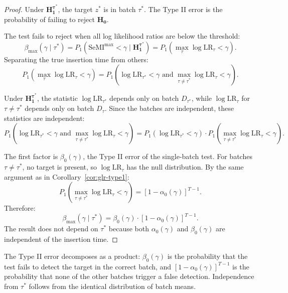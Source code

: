 \documentclass{article}
\theoremstyle{plain}
\theoremstyle{definition}
\theoremstyle{remark}
\newcommand{\SeMImax}{\mathrm{SeMI}^{\max}}
\begin{document}
\begin{proof}
    Under $\mathbf{H_1^{\tau^*}}$, the target $z^*$ is in batch $\tau^*$. The Type II error is the probability of failing to reject $\mathbf{H_0}$.

    The test fails to reject when all log likelihood ratios are below the threshold:
    \begin{equation*}
        \beta_{\max}(\gamma \mid \tau^*) = P_1(\SeMImax < \gamma \mid \mathbf{H_1^{\tau^*}}) = P_1\left(\max_{\tau} \log \mathrm{LR}_\tau < \gamma\right).
    \end{equation*}
    Separating the true insertion time from others:
    \begin{equation*}
        P_1\left(\max_{\tau} \log \mathrm{LR}_\tau < \gamma\right) = P_1\left(\log \mathrm{LR}_{\tau^*} < \gamma \text{ and } \max_{\tau \neq \tau^*} \log \mathrm{LR}_\tau < \gamma\right).
    \end{equation*}

    Under $\mathbf{H_1^{\tau^*}}$, the statistic $\log \mathrm{LR}_{\tau^*}$ depends only on batch $D_{\tau^*}$, while $\log \mathrm{LR}_\tau$ for $\tau \neq \tau^*$ depends only on batch $D_\tau$. Since the batches are independent, these statistics are independent:
    \begin{equation*}
        P_1\left(\log \mathrm{LR}_{\tau^*} < \gamma \text{ and } \max_{\tau \neq \tau^*} \log \mathrm{LR}_\tau < \gamma\right) = P_1(\log \mathrm{LR}_{\tau^*} < \gamma) \cdot P_1\left(\max_{\tau \neq \tau^*} \log \mathrm{LR}_\tau < \gamma\right).
    \end{equation*}

    The first factor is $\beta_0(\gamma)$, the Type II error of the single-batch test. For batches $\tau \neq \tau^*$, no target is present, so $\log \mathrm{LR}_\tau$ has the null distribution. By the same argument as in Corollary~\ref{cor:glr-type1}:
    \begin{equation*}
        P_1\left(\max_{\tau \neq \tau^*} \log \mathrm{LR}_\tau < \gamma\right) = [1 - \alpha_0(\gamma)]^{T-1}.
    \end{equation*}
    Therefore:
    \begin{equation*}
        \beta_{\max}(\gamma \mid \tau^*) = \beta_0(\gamma) \cdot [1 - \alpha_0(\gamma)]^{T-1}.
    \end{equation*}
    The result does not depend on $\tau^*$ because both $\alpha_0(\gamma)$ and $\beta_0(\gamma)$ are independent of the insertion time.
\end{proof}
The Type II error decomposes as a product: $\beta_0(\gamma)$ is the probability that the test fails to detect the target in the correct batch, and $[1-\alpha_0(\gamma)]^{T-1}$ is the probability that none of the other batches trigger a false detection. Independence from $\tau^*$ follows from the identical distribution of batch means.
\end{document}
